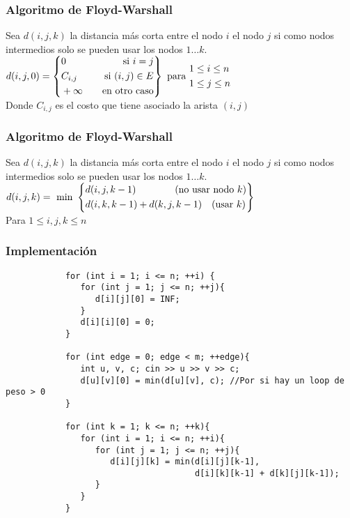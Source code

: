 \documentclass{beamer}
\begin{document}
	\begin{frame}
		\frametitle{Algoritmo de Floyd-Warshall}
		Sea $d(i, j, k)$ la distancia más corta entre el nodo $i$ el nodo $j$ si como nodos intermedios solo se pueden usar los nodos $1 \ldots k$. \\ \vfill
		$d(i, j, 0) =
		\left\{
			\begin{aligned}
				& 0       &\text{\quad si } i = j\\
				& C_{i,j} &\text{\quad si } (i, j) \in E\\
				& +\infty &\text{\quad en otro caso}
			\end{aligned}
		\right\}
		\text{ para } 
			\begin{aligned}
				& 1 \leq i \leq n\\
				& 1 \leq j \leq n\\
			\end{aligned}
		$\\ \vfill 
		Donde $C_{i, j}$ es el costo que tiene asociado la arista $(i, j)$
	\end{frame}
	
	\begin{frame}
		\frametitle{Algoritmo de Floyd-Warshall}
		Sea $d(i, j, k)$ la distancia más corta entre el nodo $i$ el nodo $j$ si como nodos intermedios solo se pueden usar los nodos $1 \ldots k$. \\ \vfill
		$d(i, j, k) = \text{ min }
		\left\{
			\begin{aligned}
				& d(i, j, k-1)                \text{\qquad\qquad (no usar nodo } k) \\
				& d(i, k, k-1) + d(k, j, k-1) \text{\quad(usar } k) \\
			\end{aligned}
		\right\}
		$\\ \vfill
		Para $ 1 \leq i, j, k \leq n $\\
	\end{frame}
	
	\begin{frame}[fragile]
		\frametitle{Implementación}
		\begin{lstlisting}
			for (int i = 1; i <= n; ++i) {
			   for (int j = 1; j <= n; ++j){
			      d[i][j][0] = INF;
			   }
			   d[i][i][0] = 0;
			}

			for (int edge = 0; edge < m; ++edge){
			   int u, v, c; cin >> u >> v >> c;
			   d[u][v][0] = min(d[u][v], c); //Por si hay un loop de peso > 0
			}
			
			for (int k = 1; k <= n; ++k){
			   for (int i = 1; i <= n; ++i){
			      for (int j = 1; j <= n; ++j){
			         d[i][j][k] = min(d[i][j][k-1],
			                          d[i][k][k-1] + d[k][j][k-1]);
			      }
			   }
			}
		\end{lstlisting}
	\end{frame}
	
\end{document}
